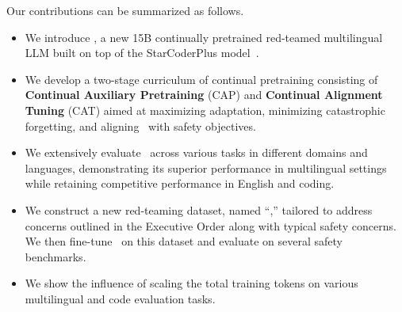 
Our contributions can be summarized as follows.
\begin{itemize}
    \vspace{-0.2em}
    \item We introduce \textcolor{violet}{\system}, a new 15B continually pretrained red-teamed multilingual LLM built on top of the StarCoderPlus model~\citep{li2023starcoder}.
    \item We develop a two-stage curriculum of continual pretraining consisting of \textbf{Continual Auxiliary Pretraining} (CAP) and \textbf{Continual Alignment Tuning} (CAT) aimed at maximizing adaptation, minimizing catastrophic forgetting, and aligning \system\ with safety objectives. 
    \item We extensively evaluate \system\ across various tasks in different domains and languages, demonstrating its superior performance in multilingual settings while retaining competitive performance in English and coding.
    \item We construct a new red-teaming dataset, named ``,'' tailored to address concerns outlined in the Executive Order along with typical safety concerns. We then fine-tune \system\ on this dataset and evaluate on several safety benchmarks.
    \item We show the influence of scaling the total training tokens on various multilingual and code evaluation tasks.
    \vspace{-0.2em}
\end{itemize}


